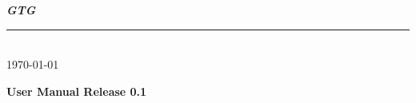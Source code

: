 \documentclass{article}
\begin{document}
\noindent
{\Huge\bfseries \textit{GTG} }\\
\rule[1ex]{\textwidth}{1pt}\\[1ex]
\textsf{\Large {} \today}\\




\begin{center}
{

\Huge\bfseries\center User Manual
\medskip
\Large\bfseries\center Release 0.1
}



\end{center}

\tableofcontents

\newcommand\ViTE{\emph{ViTE}}
\newcommand\eztrace{\emph{EzTrace}}
\newcommand\GTG{\emph{GTG}}
\newcommand\paje{\emph{Paje}}
\newcommand\OTF{\emph{OTF}}
\newcommand\TAU{\emph{TAU}}






\end{document}
